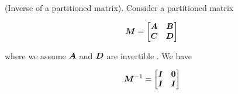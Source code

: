 \begin{thm} (Inverse of a partitioned matrix). Consider a partitioned matrix

\begin{equation}
{\bm{M}} = \begin{bmatrix} {\bm{A}} & {\bm{B}} \\ {\bm{C}} & {\bm{D}} \end{bmatrix}
\end{equation}

where we assume ${\bm{A}}$ and ${\bm{D}}$ are invertible . We have

\begin{equation}
{\bm{M}}^{-1} = \begin{bmatrix} {\bm{I}} & {\bm{0}} \\ {\bm{I}} & {\bm{I}} \end{bmatrix}
\end{equation}
\end{thm}

